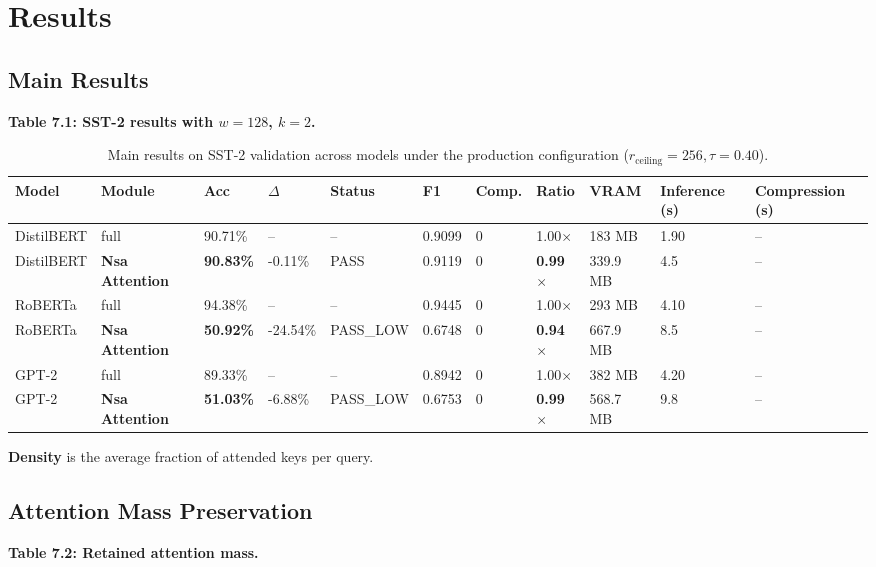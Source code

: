 
\section{Results}

\subsection{Main Results}

\textbf{Table 7.1: SST-2 results with $w = 128$, $k = 2$.}

\begin{table}[t]
\centering
\small
\begin{tabular}{lllllllllll}
\toprule
\textbf{Model} & \textbf{Module} & \textbf{Acc} & \textbf{$\Delta$} & \textbf{Status} & \textbf{F1} & \textbf{Comp.} & \textbf{Ratio} & \textbf{VRAM} & \textbf{Inference (s)} & \textbf{Compression (s)} \\
\midrule
DistilBERT & full & 90.71\% & -- & -- & 0.9099 & 0 & 1.00$\times$ & 183 MB & 1.90 & -- \\
DistilBERT & \textbf{Nsa Attention} & \textbf{90.83\%} & -0.11\% & PASS & 0.9119 & 0 & \textbf{0.99$\times$} & 339.9 MB & 4.5 & -- \\
RoBERTa & full & 94.38\% & -- & -- & 0.9445 & 0 & 1.00$\times$ & 293 MB & 4.10 & -- \\
RoBERTa & \textbf{Nsa Attention} & \textbf{50.92\%} & -24.54\% & PASS_LOW & 0.6748 & 0 & \textbf{0.94$\times$} & 667.9 MB & 8.5 & -- \\
GPT-2 & full & 89.33\% & -- & -- & 0.8942 & 0 & 1.00$\times$ & 382 MB & 4.20 & -- \\
GPT-2 & \textbf{Nsa Attention} & \textbf{51.03\%} & -6.88\% & PASS_LOW & 0.6753 & 0 & \textbf{0.99$\times$} & 568.7 MB & 9.8 & -- \\
\bottomrule
\end{tabular}
\caption{Main results on SST-2 validation across models under the production configuration ($r_{\mathrm{ceiling}}=256, \tau=0.40$).}
\label{tab:main_sst2}
\end{table}

\textbf{Density} is the average fraction of attended keys per query.

\subsection{Attention Mass Preservation}

\textbf{Table 7.2: Retained attention mass.}

